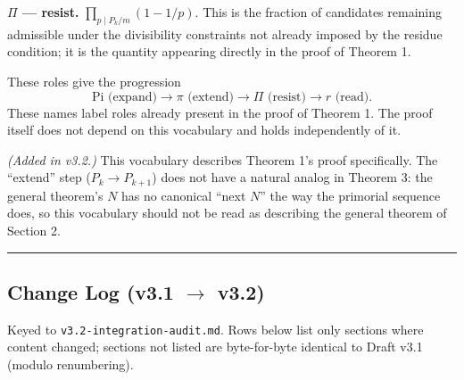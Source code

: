 \documentclass[
]{article}
\begin{document}
\textbf{\(\Pi\) --- resist.} \(\prod_{p\mid P_k/m}(1-1/p)\). This is the
fraction of candidates remaining admissible under the divisibility
constraints not already imposed by the residue condition; it is the
quantity appearing directly in the proof of Theorem 1.

These roles give the progression \[
\text{Pi (expand)} \to \pi\text{ (extend)} \to \Pi\text{ (resist)} \to r\text{ (read)}.
\] These names label roles already present in the proof of Theorem 1.
The proof itself does not depend on this vocabulary and holds
independently of it.

\emph{(Added in v3.2.)} This vocabulary describes Theorem 1's proof
specifically. The ``extend'' step (\(P_k\to P_{k+1}\)) does not have a
natural analog in Theorem 3: the general theorem's \(N\) has no
canonical ``next \(N\)'' the way the primorial sequence does, so this
vocabulary should not be read as describing the general theorem of
Section 2.

\begin{center}\rule{0.5\linewidth}{0.5pt}\end{center}

\subsection{\texorpdfstring{Change Log (v3.1 \(\to\) v3.2)}{Change Log (v3.1 -> v3.2)}}\label{change-log-v3.1-v3.2}

Keyed to \texttt{v3.2-integration-audit.md}. Rows below list only
sections where content changed; sections not listed are byte-for-byte
identical to Draft v3.1 (modulo renumbering).
\end{document}
